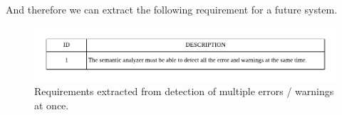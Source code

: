 And therefore we can extract the following requirement for a future system.

\begin{figure}[h!]
    \includegraphics[scale=0.8]{images/mul-err-req.pdf}
    \centering
    \caption[Requirements extracted from detection of multiple errors / warnings at once]{Requirements extracted from detection of multiple errors / warnings at once.}
    \label{fig:mul-err-req}
\end{figure}